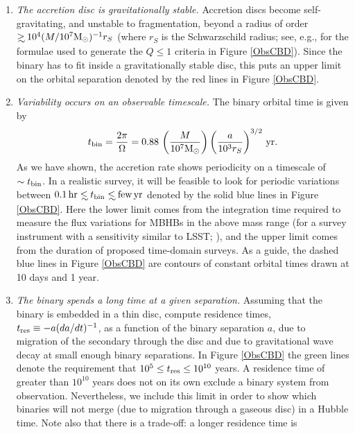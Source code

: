 \begin{enumerate}
{%
	\begin{enumerate}
%
		\item{\textit{The accretion disc is gravitationally stable.} Accretion discs become
		self-gravitating, and unstable to fragmentation, beyond a radius of
		order $ \gsim 10^4 (M/10^7 {\rm M_\odot})^{-1} r_S$ (where $r_S$ is
		the Schwarzschild radius; see, e.g., \citealt{Goodman:2003,HKM09} for the formulae used to generate the $Q\leq1$ criteria in Figure \ref{ObsCBD}).
		Since the binary has to fit inside a gravitationally stable disc, this
		puts an upper limit on the orbital separation denoted by the red lines in Figure \ref{ObsCBD}.}
%
		\item{\textit{Variability occurs on an observable timescale.} The binary orbital time is given by
		\begin{equation}
		 t_{\rm bin} = \frac{2\pi}{\Omega} = 0.88\, 
		\left(\frac{M}{10^7{\rm M_\odot}}\right)
		\left(\frac{a}{10^3 r_S}\right)^{3/2}\, {\rm yr}.
		\label{eq:torb}
		\end{equation}
		As we have shown, the accretion rate shows periodicity on a timescale
		of $\sim t_{\rm bin}$.  In a realistic survey, it will be feasible to
		look for periodic variations between $0.1\,{\rm hr} \lsim
		t_{\rm bin} \lsim {\rm few}\, {\rm yr}$ denoted by the solid blue lines in Figure \ref{ObsCBD}.  
		Here the lower limit comes from the integration time required to measure the flux variations for
		MBHBs in the above mass range (for a survey instrument with a
		sensitivity similar to LSST; \citealt{HKM09}), and the upper limit
		comes from the duration of proposed time-domain surveys.  As a guide, 
		the dashed blue lines in Figure \ref{ObsCBD} are contours of constant orbital times drawn at 10 days and 1 year.}
%
		\item{\textit{The binary spends a long time at a given separation.} 
		Assuming that the binary is embedded in a thin disc,
		\citealt{HKM09} compute residence times, $t_{\rm res}\equiv -a
		(da/dt)^{-1}$, as a function of the binary separation $a$, due to 
		migration of the secondary through the disc and due to gravitational wave 
		decay at small enough binary separations. In Figure \ref{ObsCBD} 
		the green lines denote the requirement that $10^5 \leq t_{\rm res} \leq 10^{10}$ years. 
		A residence time of greater than $10^{10}$ years does not on its own exclude a 
		binary system from observation. Nevertheless, we include this limit in order to show 
		which binaries will not merge (due to migration through a gaseous disc) in a 
		Hubble time. Note also that there is a trade-off: a longer residence time is 
}
\end{enumerate}}
\end{enumerate}
